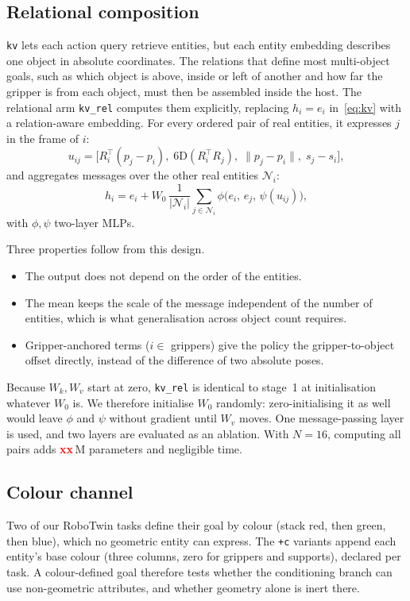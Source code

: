 \documentclass[letterpaper, 10pt, journal, twoside]{IEEEtran}
\newcommand{\tbd}[1][]{\textcolor{red}{\textbf{xx}#1}}
\newcommand{\arm}[1]{\texttt{#1}}
\begin{document}
\subsection{Relational composition}
\label{sec:method-rel}
\arm{kv} lets each action query retrieve entities, but each entity embedding
describes one object in absolute coordinates. The relations that define
most multi-object goals, such as which object is above, inside or
left of another and how far the gripper is from each object, must then be
assembled inside the host. The relational arm \arm{kv\_rel} computes them
explicitly, replacing $h_i{=}e_i$ in~\eqref{eq:kv} with a relation-aware
embedding. For every ordered pair of real entities, it expresses $j$ in the
frame of $i$:
\begin{equation}
  u_{ij} = \big[R_i^\top(p_j-p_i),\; \mathrm{6D}(R_i^\top R_j),\;
  \lVert p_j-p_i\rVert,\; s_j-s_i\big],
\end{equation}
and aggregates messages over the other real entities $\mathcal N_i$:
\begin{equation}
  h_i = e_i + W_0\,\frac{1}{|\mathcal N_i|}\sum_{j\in\mathcal N_i}
  \phi\big(e_i,\, e_j,\, \psi(u_{ij})\big),
  \label{eq:rel}
\end{equation}
with $\phi,\psi$ two-layer MLPs.

Three properties follow from this design.
\begin{itemize}
  \item The output does not depend on the order of the entities.
  \item The mean keeps the scale of the message independent of the number
    of entities, which is what generalisation across object count requires.
  \item Gripper-anchored terms ($i\in$ grippers) give the policy the
    gripper-to-object offset directly, instead of the difference of two
    absolute poses.
\end{itemize}
Because $W_k,W_v$ start at zero, \arm{kv\_rel} is identical to stage~1 at
initialisation whatever $W_0$ is. We therefore initialise $W_0$ randomly:
zero-initialising it as well would leave $\phi$ and $\psi$ without gradient
until $W_v$ moves. One message-passing layer is used, and two layers are
evaluated as an ablation. With $N{=}16$, computing all pairs adds
\tbd{}\,M parameters and negligible time.

\subsection{Colour channel}
\label{sec:method-colour}
Two of our RoboTwin tasks define their goal by colour (stack red, then
green, then blue), which no geometric entity can express. The \arm{+c}
variants append each entity's base colour (three columns, zero for grippers
and supports), declared per task. A colour-defined goal therefore tests
whether the conditioning branch can use non-geometric attributes, and
whether geometry alone is inert there.
\end{document}
